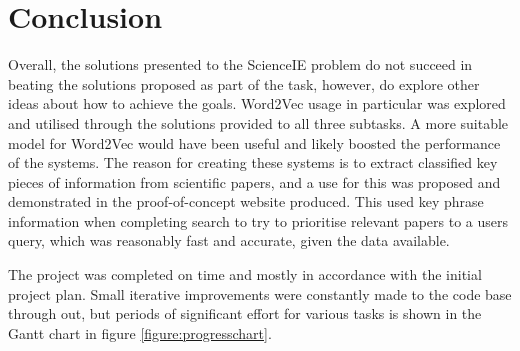 \chapter{Conclusion}
Overall, the solutions presented to the ScienceIE problem do not succeed in beating the solutions proposed as part of the task, however, do explore other ideas about how to achieve the goals. Word2Vec usage in particular was explored and utilised through the solutions provided to all three subtasks. A more suitable model for Word2Vec would have been useful and likely boosted the performance of the systems. The reason for creating these systems is to extract classified key pieces of information from scientific papers, and a use for this was proposed and demonstrated in the proof-of-concept website produced. This used key phrase information when completing search to try to prioritise relevant papers to a users query, which was reasonably fast and accurate, given the data available. 

The project was completed on time and mostly in accordance with the initial project plan. Small iterative improvements were constantly made to the code base through out, but periods of significant effort for various tasks is shown in the Gantt chart in figure \ref{figure:progresschart}.

